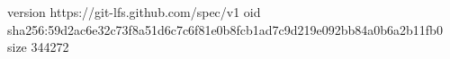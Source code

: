 version https://git-lfs.github.com/spec/v1
oid sha256:59d2ac6e32c73f8a51d6c7c6f81e0b8fcb1ad7c9d219e092bb84a0b6a2b11fb0
size 344272
